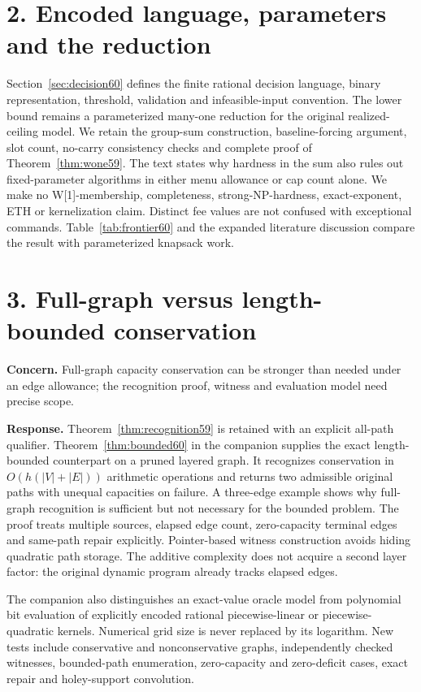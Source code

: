 \section*{2. Encoded language, parameters and the reduction}
Section~\ref{sec:decision60} defines the finite rational decision language, binary representation, threshold, validation and infeasible-input convention. The lower bound remains a parameterized many-one reduction for the original realized-ceiling model. We retain the group-sum construction, baseline-forcing argument, slot count, no-carry consistency checks and complete proof of Theorem~\ref{thm:wone59}. The text states why hardness in the sum also rules out fixed-parameter algorithms in either menu allowance or cap count alone. We make no W[1]-membership, completeness, strong-NP-hardness, exact-exponent, ETH or kernelization claim. Distinct fee values are not confused with exceptional commands. Table~\ref{tab:frontier60} and the expanded literature discussion compare the result with parameterized knapsack work.

\section*{3. Full-graph versus length-bounded conservation}
\textbf{Concern.} Full-graph capacity conservation can be stronger than needed under an edge allowance; the recognition proof, witness and evaluation model need precise scope.

\textbf{Response.} Theorem~\ref{thm:recognition59} is retained with an explicit all-path qualifier. Theorem~\ref{thm:bounded60} in the companion supplies the exact length-bounded counterpart on a pruned layered graph. It recognizes conservation in $O(h(|V|+|E|))$ arithmetic operations and returns two admissible original paths with unequal capacities on failure. A three-edge example shows why full-graph recognition is sufficient but not necessary for the bounded problem. The proof treats multiple sources, elapsed edge count, zero-capacity terminal edges and same-path repair explicitly. Pointer-based witness construction avoids hiding quadratic path storage. The additive complexity does not acquire a second layer factor: the original dynamic program already tracks elapsed edges.

The companion also distinguishes an exact-value oracle model from polynomial bit evaluation of explicitly encoded rational piecewise-linear or piecewise-quadratic kernels. Numerical grid size is never replaced by its logarithm. New tests include conservative and nonconservative graphs, independently checked witnesses, bounded-path enumeration, zero-capacity and zero-deficit cases, exact repair and holey-support convolution.

